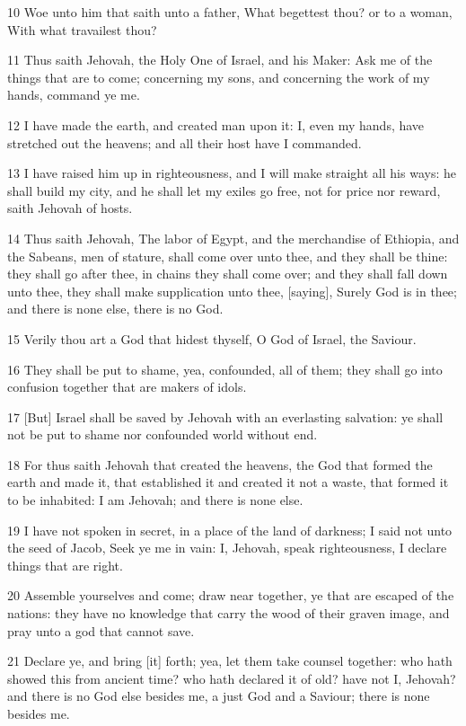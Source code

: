 \par 10 Woe unto him that saith unto a father, What begettest thou? or to a woman, With what travailest thou?
\par 11 Thus saith Jehovah, the Holy One of Israel, and his Maker: Ask me of the things that are to come; concerning my sons, and concerning the work of my hands, command ye me.
\par 12 I have made the earth, and created man upon it: I, even my hands, have stretched out the heavens; and all their host have I commanded.
\par 13 I have raised him up in righteousness, and I will make straight all his ways: he shall build my city, and he shall let my exiles go free, not for price nor reward, saith Jehovah of hosts.
\par 14 Thus saith Jehovah, The labor of Egypt, and the merchandise of Ethiopia, and the Sabeans, men of stature, shall come over unto thee, and they shall be thine: they shall go after thee, in chains they shall come over; and they shall fall down unto thee, they shall make supplication unto thee, [saying], Surely God is in thee; and there is none else, there is no God.
\par 15 Verily thou art a God that hidest thyself, O God of Israel, the Saviour.
\par 16 They shall be put to shame, yea, confounded, all of them; they shall go into confusion together that are makers of idols.
\par 17 [But] Israel shall be saved by Jehovah with an everlasting salvation: ye shall not be put to shame nor confounded world without end.
\par 18 For thus saith Jehovah that created the heavens, the God that formed the earth and made it, that established it and created it not a waste, that formed it to be inhabited: I am Jehovah; and there is none else.
\par 19 I have not spoken in secret, in a place of the land of darkness; I said not unto the seed of Jacob, Seek ye me in vain: I, Jehovah, speak righteousness, I declare things that are right.
\par 20 Assemble yourselves and come; draw near together, ye that are escaped of the nations: they have no knowledge that carry the wood of their graven image, and pray unto a god that cannot save.
\par 21 Declare ye, and bring [it] forth; yea, let them take counsel together: who hath showed this from ancient time? who hath declared it of old? have not I, Jehovah? and there is no God else besides me, a just God and a Saviour; there is none besides me.
